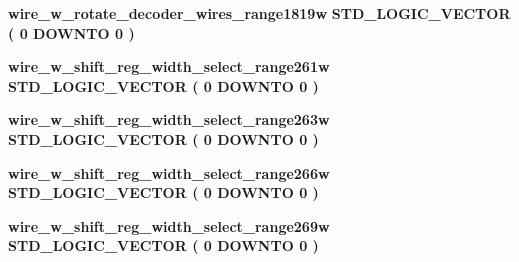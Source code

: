 \begin{DoxyCompactItemize}
{\bf wire\+\_\+w\+\_\+rotate\+\_\+decoder\+\_\+wires\+\_\+range1819w} {\bfseries \textcolor{comment}{S\+T\+D\+\_\+\+L\+O\+G\+I\+C\+\_\+\+V\+E\+C\+T\+OR}\textcolor{vhdlchar}{ }\textcolor{vhdlchar}{(}\textcolor{vhdlchar}{ }\textcolor{vhdlchar}{ } \textcolor{vhdldigit}{0} \textcolor{vhdlchar}{ }\textcolor{keywordflow}{D\+O\+W\+N\+TO}\textcolor{vhdlchar}{ }\textcolor{vhdlchar}{ } \textcolor{vhdldigit}{0} \textcolor{vhdlchar}{ }\textcolor{vhdlchar}{)}\textcolor{vhdlchar}{ }} 
\item 
{\bf wire\+\_\+w\+\_\+shift\+\_\+reg\+\_\+width\+\_\+select\+\_\+range261w} {\bfseries \textcolor{comment}{S\+T\+D\+\_\+\+L\+O\+G\+I\+C\+\_\+\+V\+E\+C\+T\+OR}\textcolor{vhdlchar}{ }\textcolor{vhdlchar}{(}\textcolor{vhdlchar}{ }\textcolor{vhdlchar}{ } \textcolor{vhdldigit}{0} \textcolor{vhdlchar}{ }\textcolor{keywordflow}{D\+O\+W\+N\+TO}\textcolor{vhdlchar}{ }\textcolor{vhdlchar}{ } \textcolor{vhdldigit}{0} \textcolor{vhdlchar}{ }\textcolor{vhdlchar}{)}\textcolor{vhdlchar}{ }} 
\item 
{\bf wire\+\_\+w\+\_\+shift\+\_\+reg\+\_\+width\+\_\+select\+\_\+range263w} {\bfseries \textcolor{comment}{S\+T\+D\+\_\+\+L\+O\+G\+I\+C\+\_\+\+V\+E\+C\+T\+OR}\textcolor{vhdlchar}{ }\textcolor{vhdlchar}{(}\textcolor{vhdlchar}{ }\textcolor{vhdlchar}{ } \textcolor{vhdldigit}{0} \textcolor{vhdlchar}{ }\textcolor{keywordflow}{D\+O\+W\+N\+TO}\textcolor{vhdlchar}{ }\textcolor{vhdlchar}{ } \textcolor{vhdldigit}{0} \textcolor{vhdlchar}{ }\textcolor{vhdlchar}{)}\textcolor{vhdlchar}{ }} 
\item 
{\bf wire\+\_\+w\+\_\+shift\+\_\+reg\+\_\+width\+\_\+select\+\_\+range266w} {\bfseries \textcolor{comment}{S\+T\+D\+\_\+\+L\+O\+G\+I\+C\+\_\+\+V\+E\+C\+T\+OR}\textcolor{vhdlchar}{ }\textcolor{vhdlchar}{(}\textcolor{vhdlchar}{ }\textcolor{vhdlchar}{ } \textcolor{vhdldigit}{0} \textcolor{vhdlchar}{ }\textcolor{keywordflow}{D\+O\+W\+N\+TO}\textcolor{vhdlchar}{ }\textcolor{vhdlchar}{ } \textcolor{vhdldigit}{0} \textcolor{vhdlchar}{ }\textcolor{vhdlchar}{)}\textcolor{vhdlchar}{ }} 
\item 
{\bf wire\+\_\+w\+\_\+shift\+\_\+reg\+\_\+width\+\_\+select\+\_\+range269w} {\bfseries \textcolor{comment}{S\+T\+D\+\_\+\+L\+O\+G\+I\+C\+\_\+\+V\+E\+C\+T\+OR}\textcolor{vhdlchar}{ }\textcolor{vhdlchar}{(}\textcolor{vhdlchar}{ }\textcolor{vhdlchar}{ } \textcolor{vhdldigit}{0} \textcolor{vhdlchar}{ }\textcolor{keywordflow}{D\+O\+W\+N\+TO}\textcolor{vhdlchar}{ }\textcolor{vhdlchar}{ } \textcolor{vhdldigit}{0} \textcolor{vhdlchar}{ }\textcolor{vhdlchar}{)}\textcolor{vhdlchar}{ }} 
\item 

\end{DoxyCompactItemize}
